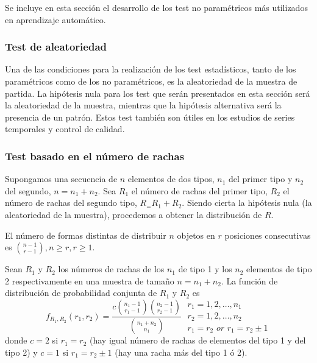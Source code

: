  
 	Se incluye en esta sección el desarrollo de los test no paramétricos más utilizados en aprendizaje automático.
 	
 	
\subsubsection{Test de aleatoriedad}

	Una de las condiciones para la realización de los test estadísticos, tanto de los paramétricos como de los no paramétricos, es la aleatoriedad de la muestra de partida. La hipótesis nula para los test que serán presentados en esta sección será la aleatoriedad de la muestra, mientras que la hipótesis alternativa será la presencia de un patrón. Estos test también son útiles en los estudios de series temporales y control de calidad.
	
\subsubsection*{Test basado en el número de rachas}

	Supongamos una secuencia de $n$ elementos de dos tipos, $n_1$ del primer tipo y $n_2$ del segundo, $n = n_1 + n_2$. Sea $R_1$ el número de rachas del primer tipo, $R_2$ el número de rachas del segundo tipo, $R_ = R_1 + R_2$. Siendo cierta la hipótesis nula (la aleatoriedad de la muestra), procedemos a obtener la distribución de $R$.
	
\begin{lema} 
	El número de formas distintas de distribuir $n$ objetos en $r$ posiciones consecutivas es ${n-1 \choose r-1}, n \geq r, r \geq 1$.
\end{lema}

\begin{teorema}
	Sean $R_1$ y $R_2$ los números de rachas de los $n_1$ de tipo 1 y los $n_2$ elementos de tipo 2 respectivamente en una muestra de tamaño $n = n_1 + n_2$. La función de distribución de probabilidad conjunta de $R_1$ y $R_2$ es
	\[ f_{R_1,R_2} (r_1, r_2) = 
		\frac{c {n_1 - 1 \choose r_1 - 1} 
				{n_2 - 1 \choose r_2 - 1}}
			{{n_1 + n_2 \choose n_1}}\;
		\begin{array}{l}
			r_1 = 1,2, \dots, n_1 \\
			r_2 = 1,2, \dots, n_2 \\
			r_1 = r_2 \textit{ or } r_1 = r_2 \pm 1
		\end{array}
	\]
	donde $c=2$ si $r_1 = r_2$ (hay igual número de rachas de elementos del tipo 1 y del tipo 2) y $c=1$ si $r_1 = r_2 \pm 1$ (hay una racha más del tipo 1 ó 2).
\end{teorema}


